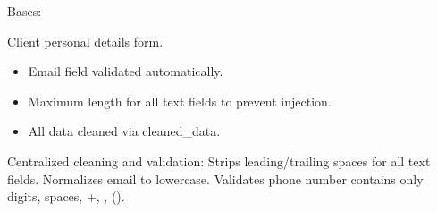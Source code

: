 \documentclass[letterpaper,10pt,english]{sphinxmanual}
\begin{document}
\begin{fulllineitems}
\label{\detokenize{index:bookings.forms.BookingDetailsForm}}
\pysigstartsignatures
\pysiglinewithargsret
{}
{\sphinxparamcomma {}\sphinxparamcomma {}\sphinxparamcomma {}\sphinxparamcomma {}\sphinxparamcomma {}\sphinxparamcomma {}\sphinxparamcomma {}\sphinxparamcomma {}\sphinxparamcomma {}\sphinxparamcomma {}\sphinxparamcomma {}}
{}
\pysigstopsignatures
\sphinxAtStartPar
Bases: 

\sphinxAtStartPar
Client personal details form.
\begin{description}
\begin{itemize}
\item {} 
\sphinxAtStartPar
Email field validated automatically.

\item {} 
\sphinxAtStartPar
Maximum length for all text fields to prevent injection.

\item {} 
\sphinxAtStartPar
All data cleaned via cleaned\_data.

\end{itemize}

\end{description}

\begin{fulllineitems}
\label{\detokenize{index:bookings.forms.BookingDetailsForm.clean}}
\pysigstartsignatures
\pysiglinewithargsret
{}
{}
{}
\pysigstopsignatures
\sphinxAtStartPar
Centralized cleaning and validation:
\sphinxhyphen{} Strips leading/trailing spaces for all text fields.
\sphinxhyphen{} Normalizes email to lowercase.
\sphinxhyphen{} Validates phone number contains only digits, spaces, +, \sphinxhyphen{}, ().


\end{fulllineitems}
\end{fulllineitems}
\end{document}
